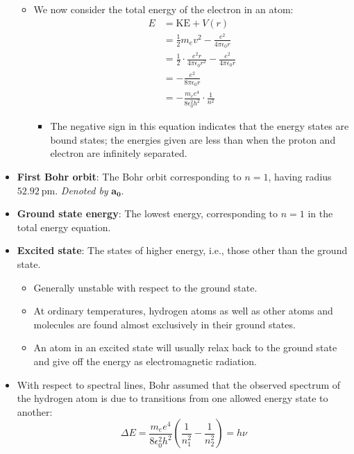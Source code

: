\documentclass[../notes.tex]{subfiles}
\begin{document}
\begin{itemize}
\begin{itemize}
\begin{itemize}
        \end{itemize}
        \item We now consider the total energy of the electron in an atom:
        \begin{align*}
            E &= \text{KE}+V(r)\\
            &= \frac{1}{2}m_ev^2-\frac{e^2}{4\pi\epsilon_0r}\\
            &= \frac{1}{2}\cdot\frac{e^2r}{4\pi\epsilon_0r^2}-\frac{e^2}{4\pi\epsilon_0r}\\
            &= -\frac{e^2}{8\pi\epsilon_0r}\\
            &= -\frac{m_ee^4}{8\epsilon_0^2h^2}\cdot\frac{1}{n^2}
        \end{align*}
        \begin{itemize}
            \item The negative sign in this equation indicates that the energy states are bound states; the energies given are less than when the proton and electron are infinitely separated.
        \end{itemize}
    \end{itemize}
    \item \textbf{First Bohr orbit}: The Bohr orbit corresponding to $n=1$, having radius $\SI{52.92}{\pico\meter}$. \emph{Denoted by} $\bm{a_0}$.
    \item \textbf{Ground state energy}: The lowest energy, corresponding to $n=1$ in the total energy equation.
    \item \textbf{Excited state}: The states of higher energy, i.e., those other than the ground state.
    \begin{itemize}
        \item Generally unstable with respect to the ground state.
        \item At ordinary temperatures, hydrogen atoms as well as other atoms and molecules are found almost exclusively in their ground states.
        \item An atom in an excited state will usually relax back to the ground state and give off the energy as electromagnetic radiation.
    \end{itemize}
    \item With respect to spectral lines, Bohr assumed that the observed spectrum of the hydrogen atom is due to transitions from one allowed energy state to another:
    \begin{equation*}
        \Delta E = \frac{m_ee^4}{8\epsilon_0^2h^2}\left( \frac{1}{n_1^2}-\frac{1}{n_2^2} \right) = h\nu

\end{equation*}
\end{itemize}
\end{document}
